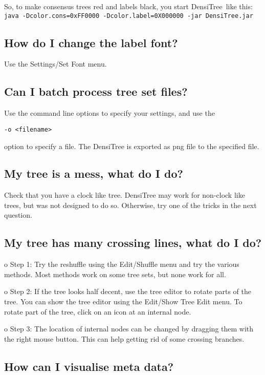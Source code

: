 \documentclass{article}
\def\DensiTree{DensiTree}
\begin{document}
So, to make consensus trees red and labels black, you start
\DensiTree\ like this:\\
{\tt java -Dcolor.cons=0xFF0000 -Dcolor.label=0X000000 -jar DensiTree.jar}\\

\subsection{How do I change the label font?}
Use the Settings/Set Font menu.

\subsection{Can I batch process tree set files?}
Use the command line options to specify your settings, and use the 
\begin{verbatim}-o <filename>\end{verbatim} option to specify a file.
The DensiTree is exported as png file to the specified file.

\subsection{My tree is a mess, what do I do?}

Check that you have a clock like tree. DensiTree may work for non-clock like trees, but
was not designed to do so. Otherwise, try one of the tricks in the next question.

\subsection{My tree has many crossing lines, what do I do?}
\noindent o Step 1: Try the reshuffle using the Edit/Shuffle menu and try the various methods.
Most methods work on some tree sets, but none work for all.

\noindent o Step 2: If the tree looks half decent, use the tree editor to rotate parts of the
tree. You can show the tree editor using the Edit/Show Tree Edit menu. To rotate part of the
tree, click on an icon at an internal node.

\noindent o Step 3: The location of internal nodes can be changed by dragging them with
the right mouse button. This can help getting rid of some crossing branches.

\subsection{How can I visualise meta data?}
\end{document}
